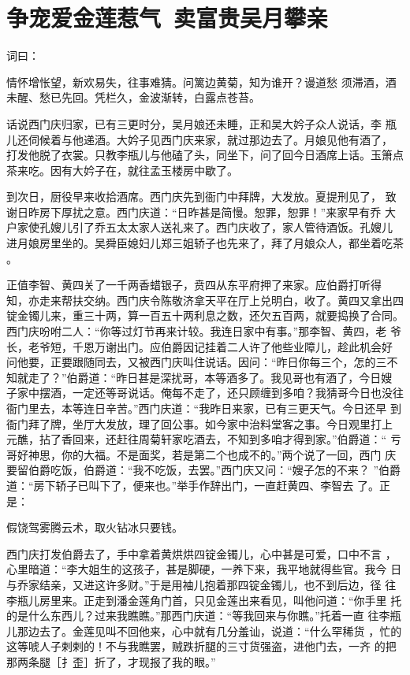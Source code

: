 \chapter{争宠爱金莲惹气~卖富贵吴月攀亲}

词曰：

情怀增怅望，新欢易失，往事难猜。问篱边黄菊，知为谁开？谩道愁
须滞酒，酒未醒、愁已先回。凭栏久，金波渐转，白露点苍苔。

话说西门庆归家，已有三更时分，吴月娘还未睡，正和吴大妗子众人说话，李
瓶儿还伺候着与他递酒。大妗子见西门庆来家，就过那边去了。月娘见他有酒了，
打发他脱了衣裳。只教李瓶儿与他磕了头，同坐下，问了回今日酒席上话。玉箫点
茶来吃。因有大妗子在，就往孟玉楼房中歇了。

到次日，厨役早来收拾酒席。西门庆先到衙门中拜牌，大发放。夏提刑见了，
致谢日昨房下厚扰之意。西门庆道：“日昨甚是简慢。恕罪，恕罪！”来家早有乔
大户家使孔嫂儿引了乔五太太家人送礼来了。西门庆收了，家人管待酒饭。孔嫂儿
进月娘房里坐的。吴舜臣媳妇儿郑三姐轿子也先来了，拜了月娘众人，都坐着吃茶
。

正值李智、黄四关了一千两香蜡银子，贲四从东平府押了来家。应伯爵打听得
知，亦走来帮扶交纳。西门庆令陈敬济拿天平在厅上兑明白，收了。黄四又拿出四
锭金镯儿来，重三十两，算一百五十两利息之数，还欠五百两，就要捣换了合同。
西门庆吩咐二人：“你等过灯节再来计较。我连日家中有事。”那李智、黄四，老
爷长，老爷短，千恩万谢出门。应伯爵因记挂着二人许了他些业障儿，趁此机会好
问他要，正要跟随同去，又被西门庆叫住说话。因问：“昨日你每三个，怎的三不
知就走了？”伯爵道：“昨日甚是深扰哥，本等酒多了。我见哥也有酒了，今日嫂
子家中摆酒，一定还等哥说话。俺每不走了，还只顾缠到多咱？我猜哥今日也没往
衙门里去，本等连日辛苦。”西门庆道：“我昨日来家，已有三更天气。今日还早
到衙门拜了牌，坐厅大发放，理了回公事。如今家中治料堂客之事。今日观里打上
元醮，拈了香回来，还赶往周菊轩家吃酒去，不知到多咱才得到家。”伯爵道：“
亏哥好神思，你的大福。不是面奖，若是第二个也成不的。”两个说了一回，西门
庆要留伯爵吃饭，伯爵道：“我不吃饭，去罢。”西门庆又问：“嫂子怎的不来？
”伯爵道：“房下轿子已叫下了，便来也。”举手作辞出门，一直赶黄四、李智去
了。正是：

假饶驾雾腾云术，取火钻冰只要钱。

西门庆打发伯爵去了，手中拿着黄烘烘四锭金镯儿，心中甚是可爱，口中不言
，心里暗道：“李大姐生的这孩子，甚是脚硬，一养下来，我平地就得些官。我今
日与乔家结亲，又进这许多财。”于是用袖儿抱着那四锭金镯儿，也不到后边，径
往李瓶儿房里来。正走到潘金莲角门首，只见金莲出来看见，叫他问道：“你手里
托的是什么东西儿？过来我瞧瞧。”那西门庆道：“等我回来与你瞧。”托着一直
往李瓶儿那边去了。金莲见叫不回他来，心中就有几分羞讪，说道：“什么罕稀货
，忙的这等唬人子剌剌的！不与我瞧罢，贼跌折腿的三寸货强盗，进他门去，一齐
的把那两条腿［扌歪］折了，才现报了我的眼。”

